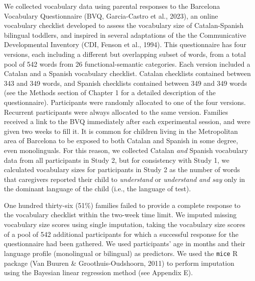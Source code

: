 \documentclass[
  12pt,
  b5paperpaper,
  twoside]{scrreprt}
\begin{document}
We collected vocabulary data using parental responses to the Barcelona
Vocabulary Questionnaire (BVQ, Garcia-Castro et al., 2023), an online
vocabulary checklist developed to assess the vocabulary size of
Catalan-Spanish bilingual toddlers, and inspired in several adaptations
of the the Communicative Developmental Inventory (CDI, Fenson et al.,
1994). This questionnaire has four versions, each including a different
but overlapping subset of words, from a total pool of 542 words from 26
functional-semantic categories. Each version included a Catalan and a
Spanish vocabulary checklist. Catalan checklists contained between 343
and 349 words, and Spanish checklists contained between 349 and 349
words (see the Methods section of Chapter 1 for a detailed description
of the questionnaire). Participants were randomly allocated to one of
the four versions. Recurrent participants were always allocated to the
same version. Families received a link to the BVQ immediately after each
experimental session, and were given two weeks to fill it. It is common
for children living in the Metropolitan area of Barcelona to be exposed
to both Catalan and Spanish in some degree, even monolinguals. For this
reason, we collected Catalan \emph{and} Spanish vocabulary data from all
participants in Study 2, but for consistency with Study 1, we calculated
vocabulary sizes for participants in Study 2 as the number of words that
caregivers reported their child to \emph{understand} or \emph{understand
and say} only in the dominant language of the child (i.e., the language
of test).

One hundred thirty-six (51\%) families failed to provide a complete
response to the vocabulary checklist within the two-week time limit. We
imputed missing vocabulary size scores using single imputation, taking
the vocabulary size scores of a pool of 542 additional participants for
which a successful response for the questionnaire had been gathered. We
used participants' age in months and their language profile (monolingual
or bilingual) as predictors. We used the \texttt{mice} R package (Van
Buuren \& Groothuis-Oudshoorn, 2011) to perform imputation using the
Bayesian linear regression method (see Appendix E).
\end{document}
